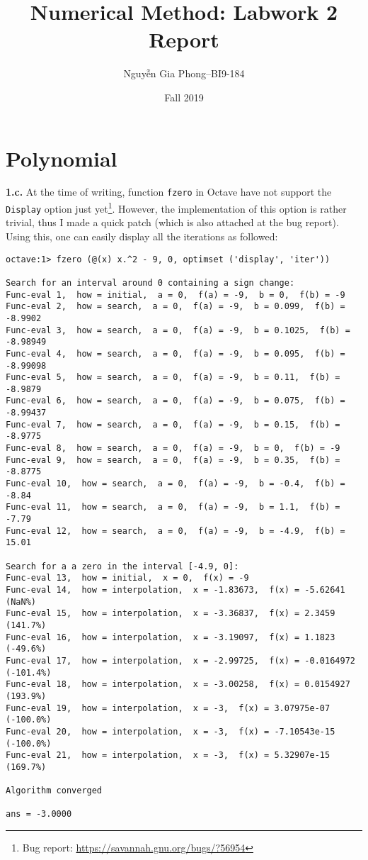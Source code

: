 \documentclass[a4paper,12pt]{article}
\title{Numerical Method: Labwork 2 Report}
\author{Nguyễn Gia Phong--BI9-184}
\date{Fall 2019}
\newcommand{\exercise}[1]{\noindent\textbf{#1.}}
\begin{document}
\maketitle
\setcounter{section}{2}
\section{Polynomial}
\exercise{1.c} At the time of writing, function \verb|fzero|
in Octave have not support the \verb|Display| option
just yet\footnote{Bug report: \url{https://savannah.gnu.org/bugs/?56954}}.
However, the implementation of this option is rather trivial,
thus I made a quick patch (which is also attached at the bug report).
Using this, one can easily display all the iterations as followed:

\begin{verbatim}
octave:1> fzero (@(x) x.^2 - 9, 0, optimset ('display', 'iter'))

Search for an interval around 0 containing a sign change:
Func-eval 1,  how = initial,  a = 0,  f(a) = -9,  b = 0,  f(b) = -9
Func-eval 2,  how = search,  a = 0,  f(a) = -9,  b = 0.099,  f(b) = -8.9902
Func-eval 3,  how = search,  a = 0,  f(a) = -9,  b = 0.1025,  f(b) = -8.98949
Func-eval 4,  how = search,  a = 0,  f(a) = -9,  b = 0.095,  f(b) = -8.99098
Func-eval 5,  how = search,  a = 0,  f(a) = -9,  b = 0.11,  f(b) = -8.9879
Func-eval 6,  how = search,  a = 0,  f(a) = -9,  b = 0.075,  f(b) = -8.99437
Func-eval 7,  how = search,  a = 0,  f(a) = -9,  b = 0.15,  f(b) = -8.9775
Func-eval 8,  how = search,  a = 0,  f(a) = -9,  b = 0,  f(b) = -9
Func-eval 9,  how = search,  a = 0,  f(a) = -9,  b = 0.35,  f(b) = -8.8775
Func-eval 10,  how = search,  a = 0,  f(a) = -9,  b = -0.4,  f(b) = -8.84
Func-eval 11,  how = search,  a = 0,  f(a) = -9,  b = 1.1,  f(b) = -7.79
Func-eval 12,  how = search,  a = 0,  f(a) = -9,  b = -4.9,  f(b) = 15.01

Search for a a zero in the interval [-4.9, 0]:
Func-eval 13,  how = initial,  x = 0,  f(x) = -9
Func-eval 14,  how = interpolation,  x = -1.83673,  f(x) = -5.62641  (NaN%)
Func-eval 15,  how = interpolation,  x = -3.36837,  f(x) = 2.3459  (141.7%)
Func-eval 16,  how = interpolation,  x = -3.19097,  f(x) = 1.1823  (-49.6%)
Func-eval 17,  how = interpolation,  x = -2.99725,  f(x) = -0.0164972  (-101.4%)
Func-eval 18,  how = interpolation,  x = -3.00258,  f(x) = 0.0154927  (193.9%)
Func-eval 19,  how = interpolation,  x = -3,  f(x) = 3.07975e-07  (-100.0%)
Func-eval 20,  how = interpolation,  x = -3,  f(x) = -7.10543e-15  (-100.0%)
Func-eval 21,  how = interpolation,  x = -3,  f(x) = 5.32907e-15  (169.7%)

Algorithm converged

ans = -3.0000
\end{verbatim}
\end{document}

